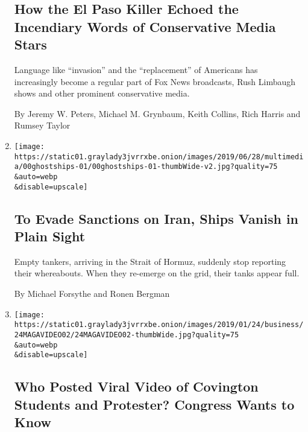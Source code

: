 \begin{enumerate}
  \hypertarget{how-the-el-paso-killer-echoed-the-incendiary-words-of-conservative-media-stars}{%
  \subsection{How the El Paso Killer Echoed the Incendiary Words of
  Conservative Media
  Stars}\label{how-the-el-paso-killer-echoed-the-incendiary-words-of-conservative-media-stars}}

  Language like ``invasion'' and the ``replacement'' of Americans has
  increasingly become a regular part of Fox News broadcasts, Rush
  Limbaugh shows and other prominent conservative media.

  By Jeremy W. Peters, Michael M. Grynbaum, Keith Collins, Rich Harris
  and Rumsey Taylor
\item
  \href{/2019/07/02/world/middleeast/china-oil-iran-sanctions.html}{}

  \texttt{[image: https://static01.graylady3jvrrxbe.onion/images/2019/06/28/multimedia/00ghostships-01/00ghostships-01-thumbWide-v2.jpg?quality=75\\\&auto=webp\\\&disable=upscale]}

  \hypertarget{to-evade-sanctions-on-iran-ships-vanish-in-plain-sight}{%
  \subsection{To Evade Sanctions on Iran, Ships Vanish in Plain
  Sight}\label{to-evade-sanctions-on-iran-ships-vanish-in-plain-sight}}

  Empty tankers, arriving in the Strait of Hormuz, suddenly stop
  reporting their whereabouts. When they re-emerge on the grid, their
  tanks appear full.

  By Michael Forsythe and Ronen Bergman
\item
  \href{/2019/01/23/technology/covington-video-protester-congress.html}{}

  \texttt{[image: https://static01.graylady3jvrrxbe.onion/images/2019/01/24/business/24MAGAVIDEO02/24MAGAVIDEO02-thumbWide.jpg?quality=75\\\&auto=webp\\\&disable=upscale]}

  \hypertarget{who-posted-viral-video-of-covington-students-and-protester-congress-wants-to-know}{%
  \subsection{Who Posted Viral Video of Covington Students and
  Protester? Congress Wants to
  Know}\label{who-posted-viral-video-of-covington-students-and-protester-congress-wants-to-know}}


\end{enumerate}
